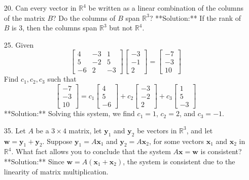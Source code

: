 \documentclass[12pt]{article}
\theoremstyle{definition}
\begin{document}
{\begin{enumerate}
    \item[20.] 
    Can every vector in \( \mathbb{R}^4 \) be written as a linear combination of the columns of the matrix \( B \)? Do the columns of \( B \) span \( \mathbb{R}^3 \)?
    **Solution:** If the rank of \( B \) is 3, then the columns span \( \mathbb{R}^3 \) but not \( \mathbb{R}^4 \).
    
    \item[25.]
    Given 
    \[
    \begin{bmatrix} 4 & -3 & 1 \\ 5 & -2 & 5 \\ -6 & 2 & -3 \end{bmatrix} \begin{bmatrix} -3 \\ -1 \\ 2 \end{bmatrix} = \begin{bmatrix} -7 \\ -3 \\ 10 \end{bmatrix}
    \]
    Find \( c_1, c_2, c_3 \) such that 
    \[
    \begin{bmatrix} -7 \\ -3 \\ 10 \end{bmatrix} = c_1 \begin{bmatrix} 4 \\ 5 \\ -6 \end{bmatrix} + c_2 \begin{bmatrix} -3 \\ -2 \\ 2 \end{bmatrix} + c_3 \begin{bmatrix} 1 \\ 5 \\ -3 \end{bmatrix}
    \]
    **Solution:** Solving this system, we find \( c_1 = 1 \), \( c_2 = 2 \), and \( c_3 = -1 \).

    \item[35.] 
    Let \( A \) be a \( 3 \times 4 \) matrix, let \( \mathbf{y}_1 \) and \( \mathbf{y}_2 \) be vectors in \( \mathbb{R}^3 \), and let \( \mathbf{w} = \mathbf{y}_1 + \mathbf{y}_2 \). Suppose \( \mathbf{y}_1 = A\mathbf{x}_1 \) and \( \mathbf{y}_2 = A\mathbf{x}_2 \), for some vectors \( \mathbf{x}_1 \) and \( \mathbf{x}_2 \) in \( \mathbb{R}^4 \). What fact allows you to conclude that the system \( A\mathbf{x} = \mathbf{w} \) is consistent?
    **Solution:** Since \( \mathbf{w} = A(\mathbf{x}_1 + \mathbf{x}_2) \), the system is consistent due to the linearity of matrix multiplication.


\end{enumerate}}
\end{document}
